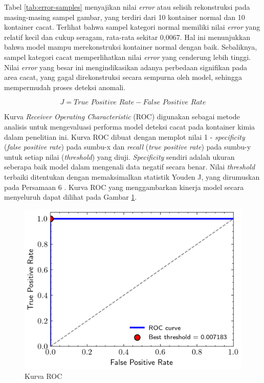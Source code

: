 Tabel \ref{tab:error-samples} menyajikan nilai \textit{error} atau
selisih rekonstruksi pada masing-masing sampel gambar, yang terdiri
dari 10 kontainer normal dan 10 kontainer cacat. Terlihat bahwa
sampel kategori normal memiliki nilai \textit{error} yang relatif
kecil dan cukup seragam, rata-rata sekitar 0,0067. Hal ini
menunjukkan bahwa model mampu merekonstruksi kontainer normal dengan
baik. Sebaliknya, sampel kategori cacat memperlihatkan nilai
\textit{error} yang cenderung lebih tinggi. Nilai \textit{error} yang
besar ini mengindikasikan adanya perbedaan signifikan pada area
cacat, yang gagal direkonstruksi secara sempurna oleh model, sehingga
mempermudah proses deteksi anomali.

\begin{equation}
  J = \textit{True Positive Rate} - \textit{False Positive Rate}
\end{equation}

Kurva \textit{Receiver Operating Characteristic} (ROC) digunakan
sebagai metode analisis untuk mengevaluasi performa model deteksi
cacat pada kontainer kimia dalam penelitian ini. Kurva ROC dibuat
dengan memplot nilai 1 - \textit{specificity} (\textit{false positive
rate}) pada sumbu-x dan \textit{recall} (\textit{true positive rate})
pada sumbu-y untuk setiap nilai (\textit{threshold}) yang diuji.
\textit{Specificity} sendiri adalah ukuran seberapa baik model dalam
mengenali data negatif secara benar. Nilai \textit{threshold}
terbaiki ditentukan dengan memaksimalkan statistik Youden J, yang
dirumuskan pada Persamaan 6
\citep{28}. Kurva ROC yang menggambarkan kinerja model secara
menyeluruh dapat dilihat pada Gambar \ref{fig:roc}.

\begin{figure}[H]
  \centering
  \includegraphics[width=\textwidth]{gambar/roc.png}
  \caption{Kurva ROC}
  \label{fig:roc}
\end{figure}
\vspace{-1em}

